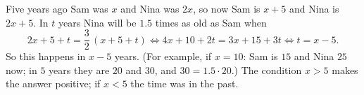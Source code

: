 Five years ago Sam was $x$ and Nina was $2x$, so now Sam is $x+5$ and Nina is $2x+5$. In $t$ years Nina will be $1.5$ times as old as Sam when
\[
2x+5+t=\dfrac{3}{2}\,(x+5+t)\iff 4x+10+2t=3x+15+3t\iff t=x-5 .
\]
So this happens in $\boxed{x-5}$ years. (For example, if $x=10$: Sam is $15$ and Nina $25$ now; in $5$ years they are $20$ and $30$, and $30=1.5\cdot20$.) The condition $x>5$ makes the answer positive; if $x<5$ the time was in the past.
